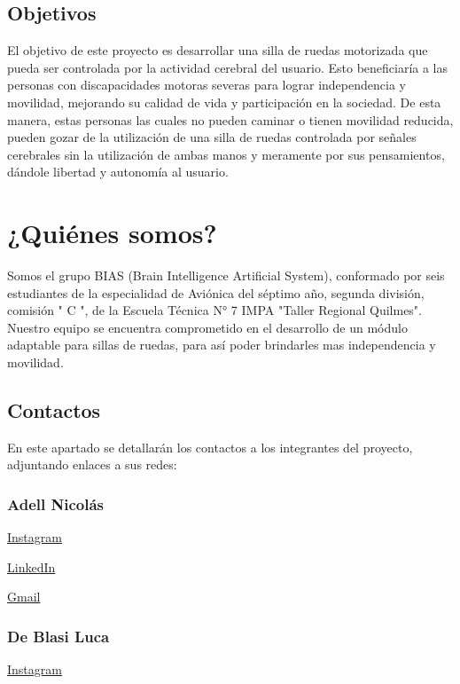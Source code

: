 \documentclass{article}
\begin{document}
\subsection{Objetivos}
El objetivo de este proyecto es desarrollar una silla de ruedas motorizada que pueda ser controlada por la actividad cerebral del usuario. Esto beneficiaría a las personas con discapacidades motoras severas para lograr independencia y movilidad, mejorando su calidad de vida y participación en la sociedad. De esta manera, estas personas las cuales no pueden caminar o tienen movilidad reducida, pueden gozar de la utilización de una silla de ruedas controlada por señales cerebrales sin la utilización de ambas manos y meramente por sus pensamientos, dándole libertad y autonomía al usuario.

\section{¿Quiénes somos?}
Somos el grupo BIAS (Brain Intelligence Artificial System), conformado por seis estudiantes de la especialidad de Aviónica del séptimo año, segunda división, comisión " C ", de la Escuela Técnica N° 7 IMPA "Taller Regional Quilmes". Nuestro equipo se encuentra comprometido en el desarrollo de un módulo adaptable para sillas de ruedas, para así poder brindarles mas independencia y movilidad.
\subsection{Contactos}

En este apartado se detallarán los contactos a los integrantes del proyecto, adjuntando enlaces a sus redes:

\subsubsection{Adell Nicolás}

    \href{https://instagram.com/nicolas.adell}{Instagram}

    
    \href{http://www.linkedin.com/in/nicolas-adell-354508297}{LinkedIn}

    
    \href{mailto:nicolas.fabian2005@gmail.com}{Gmail}

\subsubsection{De Blasi Luca}

    \href{https://instagram.com/luca.deblasii}{Instagram}
\end{document}
